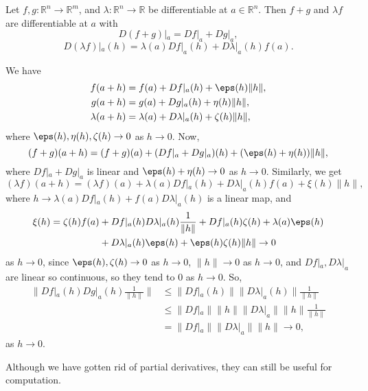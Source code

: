 \documentclass[12pt]{article}
\begin{document}
\begin{proposition}
	Let $f, g : \mathbb{R}^{n} \to \mathbb{R}^{m}$, and $\lambda : \mathbb{R}^{n} \to \mathbb{R}$ be differentiable at $a \in \mathbb{R}^{n}$. Then $f + g$ and $\lambda f$ are differentiable at $a$ with
	\[
	D(f+g)|_{a} = Df|_{a} + Dg|_a
	,\]
	\[
	D(\lambda f)|_a (h) = \lambda(a) Df|_a(h) + D\lambda|_a(h) f(a)
	.\]
\end{proposition}

\begin{proofbox}
	We have
	\begin{align*}
		f(a+h) &= f(a) + Df|_a(h) + \eps(h) \|h\|, \\
		g(a+h) &= g(a) + Dg|_a(h) + \eta(h) \|h\|, \\
		\lambda(a+h) &= \lambda(a) + D\lambda|_a(h) + \zeta(h) \|h\|,
	\end{align*}
	where $\eps(h), \eta(h), \zeta(h) \to 0$ as $h \to 0$. Now,
	\[
		(f+g)(a+h) = (f+g)(a) + (Df|_a + Dg|_a)(h) + (\eps(h) + \eta(h))\|h\|
	,\]
	where $Df|_a + Dg|_a$ is linear and $\eps(h) + \eta(h) \to 0$ as $h \to 0$. Similarly, we get
	\[
		(\lambda f)(a+h) = (\lambda f)(a) + \lambda(a) Df|_a(h) + D\lambda|_a (h) f(a) + \xi(h) \|h\|
	,\]
	where $h \to \lambda(a) Df|_a(h) + f(a) D\lambda|_a(h)$ is a linear map, and
	\begin{align*}
		\xi(h) = \zeta(h)f(a) &+ Df|_a(h)D\lambda|_a(h) \frac{1}{\|h\|} + Df|_a(h) \zeta(h) + \lambda(a) \eps(h) \\
		       &+ D\lambda|_a(h) \eps(h) + \eps(h) \zeta(h) \|h\| \to 0
	\end{align*}
	as $h \to 0$, since $\eps(h), \zeta(h) \to 0$ as $h \to 0$, $\|h\| \to 0$ as $h \to 0$, and $Df|_a, D\lambda|_a$ are linear so continuous, so they tend to $0$ as $h \to 0$. So,
	\begin{align*}
		\biggl\|Df|_a(h) Dg|_a(h) \frac{1}{\|h\|} \biggr\| &\leq \|Df|_a(h)\| \|D\lambda|_a(h)\| \frac{1}{\|h\|} \\
						      &\leq \|Df|_a\|\|h\| \|D\lambda|_a\| \|h\| \frac{1}{\|h\|} \\
						      &= \|Df|_a\| \|D\lambda|_a\| \|h\| \to 0,
	\end{align*}
	as $h \to 0$.
\end{proofbox}

Although we have gotten rid of partial derivatives, they can still be useful for computation.
\end{document}
